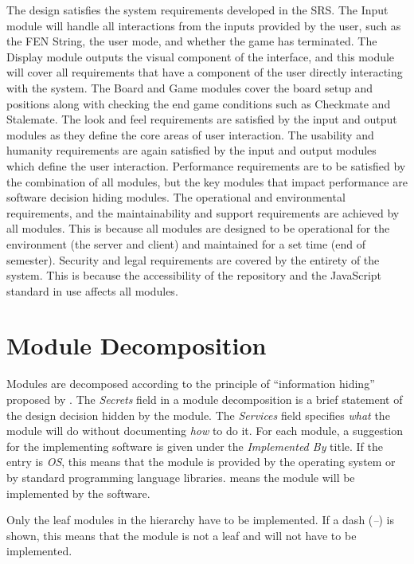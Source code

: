 \documentclass[12pt, titlepage]{article}
\begin{document}
The design satisfies the system requirements developed in the SRS. The Input module will handle all interactions from the inputs provided by the user, such as the FEN String, the user mode, and whether the game has terminated. The Display module outputs the visual component of the interface, and this module will cover all requirements that have a component of the user directly interacting with the system. The Board and Game modules cover the board setup and positions along with checking the end game conditions such as Checkmate and Stalemate. The look and feel requirements are satisfied by the input and output modules as they define the core areas of user interaction. The usability and humanity requirements are again satisfied by the input and output modules which define the user interaction. Performance requirements are to be satisfied by the combination of all modules, but the key modules that impact performance are software decision hiding modules. The operational and environmental requirements, and the maintainability and support requirements are achieved by all modules. This is because all modules are designed to be operational for the environment (the server and client) and maintained for a set time (end of semester). Security and legal requirements are covered by the entirety of the system. This is because the accessibility of the repository and the JavaScript standard in use affects all modules.

\section{Module Decomposition} \label{SecMD}

Modules are decomposed according to the principle of ``information hiding''
proposed by \citet{ParnasEtAl1984}. The \emph{Secrets} field in a module
decomposition is a brief statement of the design decision hidden by the
module. The \emph{Services} field specifies \emph{what} the module will do
without documenting \emph{how} to do it. For each module, a suggestion for the
implementing software is given under the \emph{Implemented By} title. If the
entry is \emph{OS}, this means that the module is provided by the operating
system or by standard programming language libraries.  \emph{\progname{}} means the
module will be implemented by the \progname{} software.

Only the leaf modules in the hierarchy have to be implemented. If a dash
(\emph{--}) is shown, this means that the module is not a leaf and will not have
to be implemented.
\end{document}
